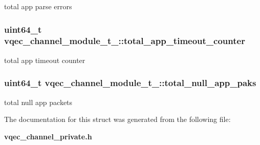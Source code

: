 total app parse errors 
\subsubsection{\setlength{\rightskip}{0pt plus 5cm}uint64\_\-t \bf{vqec\_\-channel\_\-module\_\-t\_\-::total\_\-app\_\-timeout\_\-counter}}\label{structvqec__channel__module__t___7e6020971305d753780a4a64068fd48b}


total app timeout counter 
\subsubsection{\setlength{\rightskip}{0pt plus 5cm}uint64\_\-t \bf{vqec\_\-channel\_\-module\_\-t\_\-::total\_\-null\_\-app\_\-paks}}\label{structvqec__channel__module__t___2534afbc6d4e0282b9321e45b51a1a01}


total null app packets 

The documentation for this struct was generated from the following file:\begin{CompactItemize}
\item 
\bf{vqec\_\-channel\_\-private.h}\end{CompactItemize}
